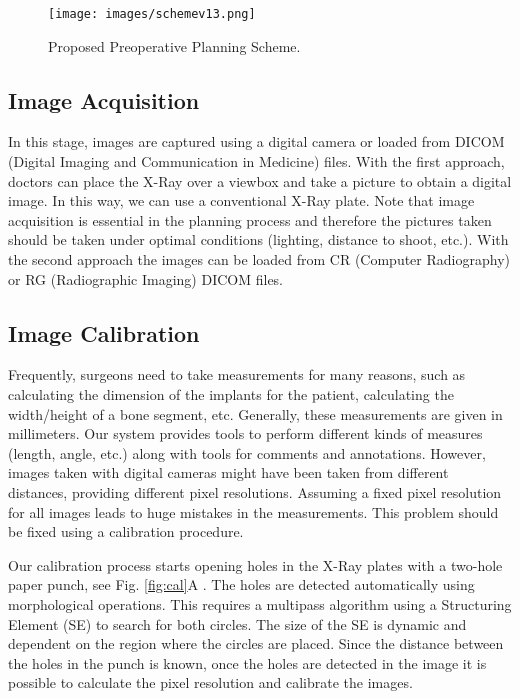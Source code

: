 \documentclass{cimenics}
\begin{document}
\begin{figure}[htb]
    \centering
    \texttt{[image: images/schemev13.png]}
    \caption{Proposed Preoperative Planning Scheme.}
    \label{fig:scheme}
\end{figure}

\subsection{Image Acquisition}

In this stage, images are captured using a digital camera or
loaded from DICOM (Digital Imaging and Communication in Medicine)
files. With the first approach, doctors can place the X-Ray over a
viewbox and take a picture to obtain a digital image. In this way,
we can use a conventional X-Ray plate. Note that image acquisition
is essential in the planning process and therefore the pictures
taken should be taken under optimal conditions (lighting, distance
to shoot, etc.). With the second approach the images can be loaded
from CR (Computer Radiography) or RG (Radiographic Imaging) DICOM
files.

\subsection{Image Calibration}

Frequently, surgeons need to take measurements for many reasons,
such as calculating the dimension of the implants for the patient,
calculating the width/height of a bone segment, etc. Generally,
these measurements are given in millimeters. Our system provides
tools to perform different kinds of measures (length, angle, etc.)
along with tools for comments and annotations. However, images
taken with digital cameras might have been taken from different
distances, providing different pixel resolutions. Assuming a fixed
pixel resolution for all images leads to huge mistakes in the
measurements. This problem should be fixed using a calibration
procedure.

Our calibration process starts opening holes in the X-Ray plates
with a two-hole paper punch, see Fig. \ref{fig:cal}\color{red}A
\color{black}.  The holes are detected automatically using
morphological operations. This requires a multipass algorithm
using a Structuring Element (SE) to search for both circles. The
size of the SE is dynamic and dependent on the region where the
circles are placed. Since the distance between the holes in the
punch is known, once the holes are detected in the image it is
possible to calculate the pixel resolution and calibrate the
images.
\end{document}
